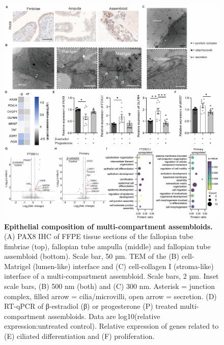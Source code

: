 \begin{refsection}
    \begin{figure}[p]
        \begin{center}
            \includegraphics[width=1\textwidth,height=0.85\textheight,keepaspectratio,clip,page=1]{figures/chapter4/fig_3.jpg}
            \captionsetup{font=small}
            \caption{\textbf{Epithelial composition of multi-compartment assembloids.} (A) PAX8 IHC of FFPE tissue sections of the fallopian tube fimbriae (top), fallopian tube ampulla (middle) and fallopian tube assembloid (bottom). Scale bar, 50 µm.  TEM of the (B) cell-Matrigel (lumen-like) interface and (C) cell-collagen I (stroma-like) interface of a multi-compartment assembloid. Scale bars, 2 µm. Inset scale bars, (B) 500 nm (both) and (C) 300 nm. Asterisk = junction complex, filled arrow = cilia/microvilli, open arrow = secretion. (D) RT-qPCR of β-estradiol (β) or progesterone (P) treated multi-compartment assembloids. Data are log10(relative expression:untreated control). Relative expression of genes related to (E) ciliated differentiation and (F) proliferation. }
            \label{chapter4_fig3}
        \end{center}
    \end{figure}
    

\end{refsection}

